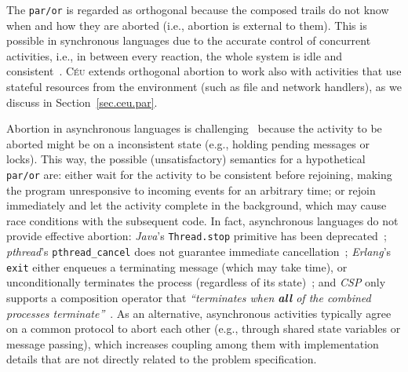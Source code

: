 \documentclass{sigplanconf}
\newcommand{\CEU}{\textsc{C\'{e}u}\xspace}
\newcommand{\code}[1] {{\small{\texttt{#1}}}}
\newcommand{\1}{\;}
\newcommand{\2}{\;\;}
\newcommand{\3}{\;\;\;}
\newcommand{\5}{\;\;\;\;\;}
\begin{document}
The \code{par/or} is regarded as orthogonal because the composed trails do not 
know when and how they are aborted (i.e., abortion is external to them).
%
This is possible in synchronous languages due to the accurate control of 
concurrent activities, i.e., in between every reaction, the whole system is 
idle and consistent~\cite{esterel.preemption}.
%
\CEU extends orthogonal abortion to work also with activities that use stateful 
resources from the environment (such as file and network handlers), as we 
discuss in Section~\ref{sec.ceu.par}.


Abortion in asynchronous languages is challenging~\cite{esterel.preemption} 
because the activity to be aborted might be on a inconsistent state (e.g., 
holding pending messages or locks).
%
This way, the possible (unsatisfactory) semantics for a hypothetical 
\code{par/or} are:
either wait for the activity to be consistent before rejoining, making the 
program unresponsive to incoming events for an arbitrary time;
or rejoin immediately and let the activity complete in the background, which 
may cause race conditions with the subsequent code.
%
%
In fact, asynchronous languages do not provide effective abortion:
\emph{Java}'s \code{Thread.stop} primitive has been 
deprecated~\cite{sync_async.threadsstop};
\emph{pthread}'s \code{pthread\_cancel} does not guarantee immediate 
cancellation~\cite{sync_async.pthreadsstop};
\emph{Erlang}'s \code{exit} either enqueues a terminating message (which may 
take time), or unconditionally terminates the process (regardless of its 
state)~\cite{sync_async.erlangstop};
and \emph{CSP} only supports a composition operator that \emph{``terminates 
when \textbf{all} of the combined processes terminate''}~\cite{async.csp}.
%
As an alternative, asynchronous activities typically agree on a common protocol 
to abort each other (e.g., through shared state variables or message passing), 
which increases coupling among them with implementation details that are not 
directly related to the problem specification.
\end{document}
